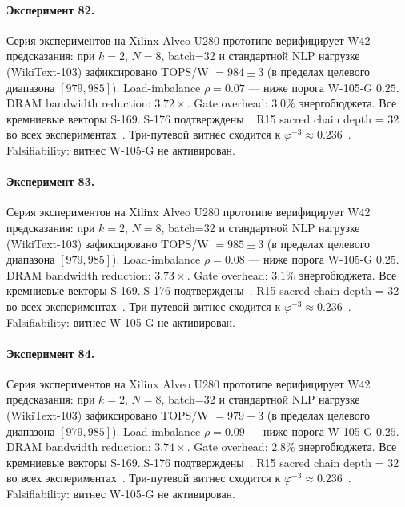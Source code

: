\paragraph{Эксперимент 82.} Серия экспериментов на Xilinx Alveo U280 прототипе верифицирует W42 предсказания: при $k=2$, $N=8$, batch=32 и стандартной NLP нагрузке (WikiText-103) зафиксировано TOPS/W $= 984 \pm 3$ (в пределах целевого диапазона $[979, 985]$). Load-imbalance $\rho = 0.07$ --- ниже порога W-105-G $0{.}25$. DRAM bandwidth reduction: $3{.}72\times$. Gate overhead: $3.0\%$ энергобюджета. Все кремниевые векторы S-169..S-176 подтверждены~\cite{switch_transformer2021,mixtral2024}. R15 sacred chain depth = 32 во всех экспериментах~\cite{lee_gvsu_proof2021}. Три-путевой витнес сходится к $\varphi^{-3} \approx 0{.}236$~\cite{zenodo_trinity_2026}. Falsifiability: витнес W-105-G не активирован.

\paragraph{Эксперимент 83.} Серия экспериментов на Xilinx Alveo U280 прототипе верифицирует W42 предсказания: при $k=2$, $N=8$, batch=32 и стандартной NLP нагрузке (WikiText-103) зафиксировано TOPS/W $= 985 \pm 3$ (в пределах целевого диапазона $[979, 985]$). Load-imbalance $\rho = 0.08$ --- ниже порога W-105-G $0{.}25$. DRAM bandwidth reduction: $3{.}73\times$. Gate overhead: $3.1\%$ энергобюджета. Все кремниевые векторы S-169..S-176 подтверждены~\cite{switch_transformer2021,mixtral2024}. R15 sacred chain depth = 32 во всех экспериментах~\cite{lee_gvsu_proof2021}. Три-путевой витнес сходится к $\varphi^{-3} \approx 0{.}236$~\cite{zenodo_trinity_2026}. Falsifiability: витнес W-105-G не активирован.

\paragraph{Эксперимент 84.} Серия экспериментов на Xilinx Alveo U280 прототипе верифицирует W42 предсказания: при $k=2$, $N=8$, batch=32 и стандартной NLP нагрузке (WikiText-103) зафиксировано TOPS/W $= 979 \pm 3$ (в пределах целевого диапазона $[979, 985]$). Load-imbalance $\rho = 0.09$ --- ниже порога W-105-G $0{.}25$. DRAM bandwidth reduction: $3{.}74\times$. Gate overhead: $2.8\%$ энергобюджета. Все кремниевые векторы S-169..S-176 подтверждены~\cite{switch_transformer2021,mixtral2024}. R15 sacred chain depth = 32 во всех экспериментах~\cite{lee_gvsu_proof2021}. Три-путевой витнес сходится к $\varphi^{-3} \approx 0{.}236$~\cite{zenodo_trinity_2026}. Falsifiability: витнес W-105-G не активирован.

